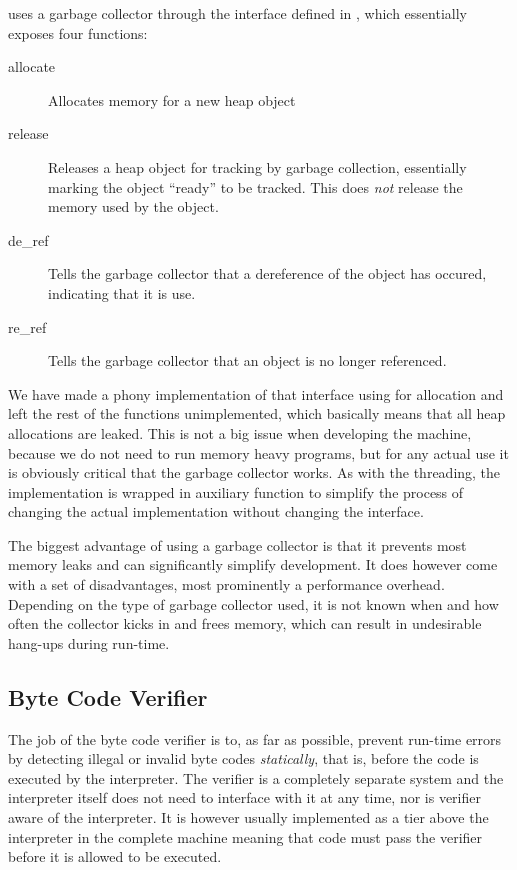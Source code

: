 \thename{} uses a garbage collector through the interface defined in
, which essentially exposes four functions:

\begin{description}
\item[allocate] Allocates memory for a new heap object
\item[release] Releases a heap object for tracking by garbage collection,
  essentially marking the object ``ready'' to be tracked. This does \textit{not}
  release the memory used by the object.
\item[de\_ref] Tells the garbage collector that a dereference of the object has
  occured, indicating that it is use.
\item[re\_ref] Tells the garbage collector that an object is no longer
  referenced.
\end{description}

We have made a phony implementation of that interface using  for
allocation and left the rest of the functions unimplemented, which basically
means that all heap allocations are leaked. This is not a big issue when
developing the machine, because we do not need to run memory heavy programs, but
for any actual use it is obviously critical that the garbage collector works. As
with the threading, the implementation is wrapped in auxiliary function to
simplify the process of changing the actual implementation without changing the
interface.

The biggest advantage of using a garbage collector is that it prevents most
memory leaks and can significantly simplify development. It does however come
with a set of disadvantages, most prominently a performance overhead. Depending
on the type of garbage collector used, it is not known when and how often the
collector kicks in and frees memory, which can result in undesirable hang-ups
during run-time.

\subsection{Byte Code Verifier}

The job of the byte code verifier is to, as far as possible, prevent run-time
errors by detecting illegal or invalid byte codes \emph{statically}, that is,
before the code is executed by the interpreter. The verifier is a completely
separate system and the interpreter itself does not need to interface with it at
any time, nor is verifier aware of the interpreter. It is however usually
implemented as a tier above the interpreter in the complete machine meaning that
code must pass the verifier before it is allowed to be executed.


